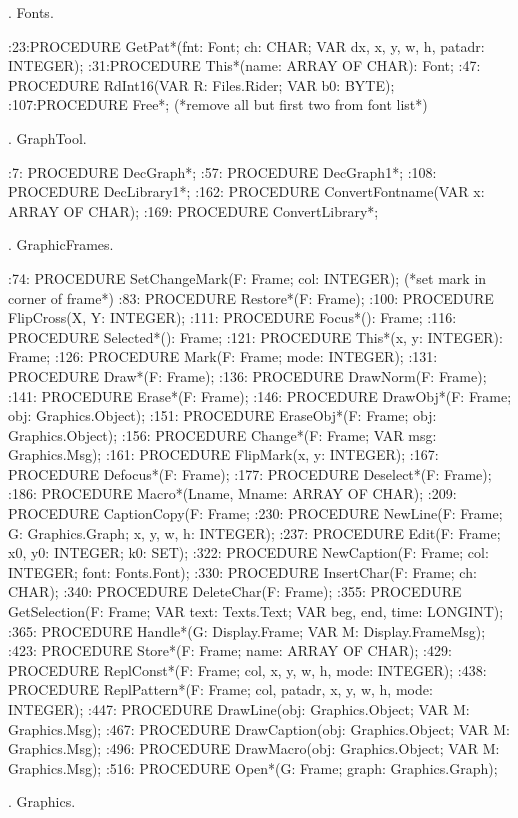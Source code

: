 . Fonts.

:23:PROCEDURE GetPat*(fnt: Font; ch: CHAR; VAR dx, x, y, w, h, patadr: INTEGER);
:31:PROCEDURE This*(name: ARRAY OF CHAR): Font;
:47:  PROCEDURE RdInt16(VAR R: Files.Rider; VAR b0: BYTE);
:107:PROCEDURE Free*;  (*remove all but first two from font list*)

. GraphTool.

:7:  PROCEDURE DecGraph*;
:57:  PROCEDURE DecGraph1*;
:108:  PROCEDURE DecLibrary1*;
:162:  PROCEDURE ConvertFontname(VAR x: ARRAY OF CHAR);
:169:  PROCEDURE ConvertLibrary*;

. GraphicFrames.

:74:  PROCEDURE SetChangeMark(F: Frame; col: INTEGER); (*set mark in corner of frame*)
:83:  PROCEDURE Restore*(F: Frame);
:100:  PROCEDURE FlipCross(X, Y: INTEGER);
:111:  PROCEDURE Focus*(): Frame;
:116:  PROCEDURE Selected*(): Frame;
:121:  PROCEDURE This*(x, y: INTEGER): Frame;
:126:  PROCEDURE Mark(F: Frame; mode: INTEGER);
:131:  PROCEDURE Draw*(F: Frame);
:136:  PROCEDURE DrawNorm(F: Frame);
:141:  PROCEDURE Erase*(F: Frame);
:146:  PROCEDURE DrawObj*(F: Frame; obj: Graphics.Object);
:151:  PROCEDURE EraseObj*(F: Frame; obj: Graphics.Object);
:156:  PROCEDURE Change*(F: Frame; VAR msg: Graphics.Msg);
:161:  PROCEDURE FlipMark(x, y: INTEGER);
:167:  PROCEDURE Defocus*(F: Frame);
:177:  PROCEDURE Deselect*(F: Frame);
:186:  PROCEDURE Macro*(Lname, Mname: ARRAY OF CHAR);
:209:  PROCEDURE CaptionCopy(F: Frame;
:230:  PROCEDURE NewLine(F: Frame; G: Graphics.Graph; x, y, w, h: INTEGER);
:237:  PROCEDURE Edit(F: Frame; x0, y0: INTEGER; k0: SET);
:322:  PROCEDURE NewCaption(F: Frame; col: INTEGER; font: Fonts.Font);
:330:  PROCEDURE InsertChar(F: Frame; ch: CHAR);
:340:  PROCEDURE DeleteChar(F: Frame);
:355:  PROCEDURE GetSelection(F: Frame; VAR text: Texts.Text; VAR beg, end, time: LONGINT);
:365:  PROCEDURE Handle*(G: Display.Frame; VAR M: Display.FrameMsg);
:423:  PROCEDURE Store*(F: Frame; name: ARRAY OF CHAR);
:429:  PROCEDURE ReplConst*(F: Frame; col, x, y, w, h, mode: INTEGER);
:438:  PROCEDURE ReplPattern*(F: Frame; col, patadr, x, y, w, h, mode: INTEGER);
:447:  PROCEDURE DrawLine(obj: Graphics.Object; VAR M: Graphics.Msg);
:467:  PROCEDURE DrawCaption(obj: Graphics.Object; VAR M: Graphics.Msg);
:496:  PROCEDURE DrawMacro(obj: Graphics.Object; VAR M: Graphics.Msg);
:516:  PROCEDURE Open*(G: Frame; graph: Graphics.Graph); 

. Graphics.

